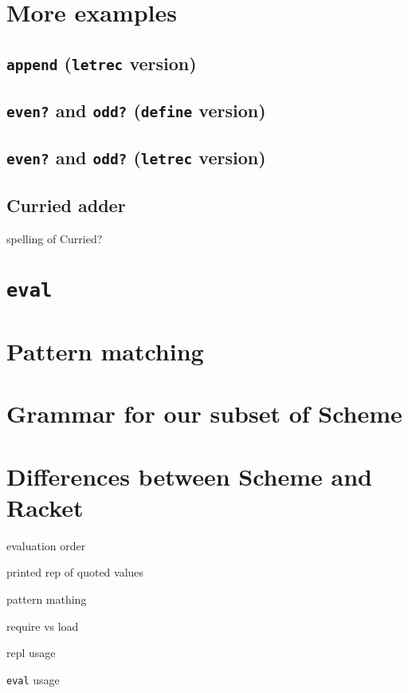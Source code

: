 \documentclass{book}
\begin{document}
\section{More examples}

\subsection{\texttt{append} (\texttt{letrec} version)}

\subsection{\texttt{even?} and \texttt{odd?} (\texttt{define} version)}

\subsection{\texttt{even?} and \texttt{odd?} (\texttt{letrec} version)}

\subsection{Curried adder}

spelling of Curried?

\section{\texttt{eval}}

\section{Pattern matching}

\section{Grammar for our subset of Scheme}

\section{Differences between Scheme and Racket}

evaluation order

printed rep of quoted values

pattern mathing

require vs load

repl usage

\verb|eval| usage
\end{document}
